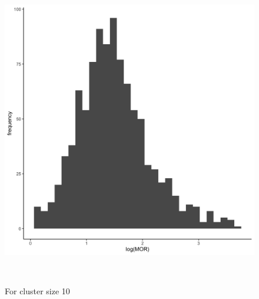 \documentclass[
  letterpaper,
  DIV=11,
  numbers=noendperiod,
  titlepage]{scrartcl}
\begin{document}
\begin{figure}
\begin{minipage}[t]{0.50\linewidth}
{{\includegraphics{../../plots/two-lvl-ran-int/low-prev/hist_10_10_two_lvl_low_prev.png}

}

\caption{For cluster size 10}

}

\end{minipage}%
\newline
\begin{minipage}[t]{\linewidth}

{\centering 

~

}

\end{minipage}%
\newline
\begin{minipage}[t]{0.50\linewidth}

{\centering 

\raisebox{-\height}{

}}
\end{minipage}
\end{figure}
\end{document}
